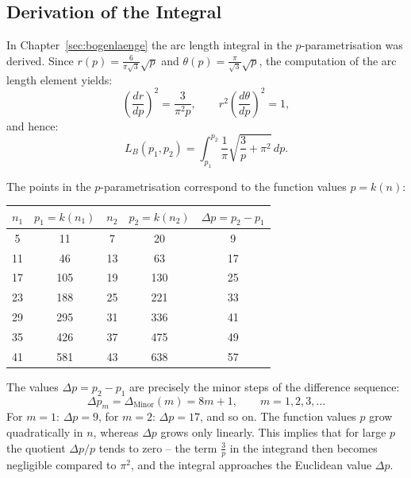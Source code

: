 \subsection{Derivation of the Integral}

In Chapter~\ref{sec:bogenlaenge} the arc length integral in the
$p$-parametrisation was derived. Since $r(p) = \frac{6}{\pi\sqrt{3}}\sqrt{p}$ and
$\theta(p) = \frac{\pi}{\sqrt{3}}\sqrt{p}$, the computation of the
arc length element yields:
\[
\left(\frac{dr}{dp}\right)^2 = \frac{3}{\pi^2 p},
\qquad
r^2\!\left(\frac{d\theta}{dp}\right)^2 = 1,
\]
and hence:
\begin{equation}
\label{eq:bogenlaenge_p}
L_B(p_1, p_2)
= \int_{p_1}^{p_2}
  \frac{1}{\pi}\sqrt{\frac{3}{p} + \pi^2}\,dp.
\end{equation}

The points in the $p$-parametrisation correspond to the function values $p = k(n)$:

\begin{center}
\begin{tabular}{ccccc}
\toprule
$n_1$ & $p_1 = k(n_1)$ & $n_2$ & $p_2 = k(n_2)$ & $\Delta p = p_2 - p_1$ \\
\midrule
 5 & 11  &  7 & 20  & 9  \\
11 & 46  & 13 & 63  & 17 \\
17 & 105 & 19 & 130 & 25 \\
23 & 188 & 25 & 221 & 33 \\
29 & 295 & 31 & 336 & 41 \\
35 & 426 & 37 & 475 & 49 \\
41 & 581 & 43 & 638 & 57 \\
\bottomrule
\end{tabular}
\end{center}

\begin{bemerkung}
The values $\Delta p = p_2 - p_1$ are precisely the minor steps of the
difference sequence:
\[
\Delta p_m = \Delta_{\mathrm{Minor}}(m) = 8m + 1, \qquad m = 1, 2, 3, \ldots
\]
For $m=1$: $\Delta p = 9$, for $m=2$: $\Delta p = 17$, and so on.
The function values $p$ grow quadratically in $n$, whereas $\Delta p$
grows only linearly. This implies that for large $p$ the quotient
$\Delta p / p$ tends to zero -- the term $\frac{3}{p}$ in the integrand then becomes
negligible compared to $\pi^2$, and the integral approaches the
Euclidean value $\Delta p$.
\end{bemerkung}

